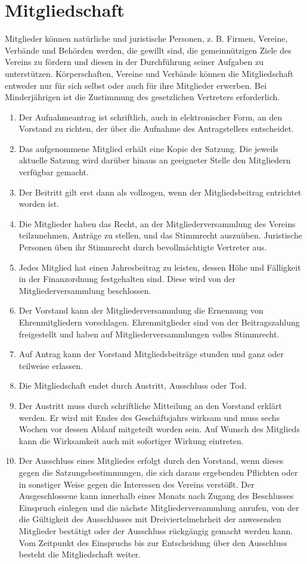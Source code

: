 \documentclass[12pt,a4paper,titlepage]{scrartcl}
\begin{document}
\section{Mitgliedschaft}
Mitglieder können natürliche und juristische Personen, z. B. Firmen, Vereine, 
Verbände und Behörden werden, die gewillt sind, die gemeinnützigen Ziele des Vereins 
zu fördern und diesen in der Durchführung seiner Aufgaben zu unterstützen. 
Körperschaften, Vereine und Verbände können die Mitgliedschaft entweder nur für sich 
selbst oder auch für ihre Mitglieder erwerben. Bei Minderjährigen ist die Zustimmung des 
gesetzlichen Vertreters erforderlich.
\begin{enumerate}
\item Der Aufnahmeantrag ist schriftlich, auch in elektronischer Form, an den 
Vorstand zu richten, der über die Aufnahme des Antragstellers entscheidet. 
\item Das aufgenommene Mitglied erhält eine Kopie der Satzung. Die jeweils 
aktuelle Satzung wird darüber hinaus an geeigneter Stelle den Mitgliedern 
verfügbar gemacht. 
\item Der Beitritt gilt erst dann als vollzogen, wenn der Mitgliedsbeitrag entrichtet 
worden ist. 
\item Die Mitglieder haben das Recht, an der Mitgliederversammlung des Vereins 
teilzunehmen, Anträge zu stellen, und das Stimmrecht auszuüben. Juristische 
Personen üben ihr Stimmrecht durch bevollmächtigte Vertreter aus. 
\item Jedes Mitglied hat einen Jahresbeitrag zu leisten, dessen Höhe und Fälligkeit 
in der Finanzordnung festgehalten sind. Diese wird von der 
Mitgliederversammlung beschlossen. 
\item Der Vorstand kann der Mitgliederversammlung die Ernennung von 
Ehrenmitgliedern vorschlagen. Ehrenmitglieder sind von der Beitragszahlung
freigestellt und haben auf Mitgliederversammlungen volles Stimmrecht. 
\item Auf Antrag kann der Vorstand Mitgliedsbeiträge stunden und ganz oder 
teilweise erlassen. 
\item Die Mitgliedschaft endet durch Austritt, Ausschluss oder Tod. 
\item Der Austritt muss durch schriftliche Mitteilung an den Vorstand erklärt werden. 
Er wird mit Endes des Geschäftsjahrs wirksam und muss sechs Wochen vor 
dessen Ablauf mitgeteilt worden sein. Auf Wunsch des Mitglieds kann die 
Wirksamkeit auch mit sofortiger Wirkung eintreten. 
\item Der Ausschluss eines Mitgliedes erfolgt durch den Vorstand, wenn dieses gegen die Satzungsbestimmungen, die sich daraus ergebenden Pflichten oder in sonstiger Weise gegen die Interessen des Vereins verstößt. Der Ausgeschlossene kann 
innerhalb eines Monats nach Zugang des Beschlusses Einspruch einlegen und 
die nächste Mitgliederversammlung anrufen, von der die Gültigkeit des 
Ausschlusses mit Dreiviertelmehrheit der anwesenden Mitglieder bestätigt oder 
der Ausschluss rückgängig gemacht werden kann. Vom Zeitpunkt des 
Einspruchs bis zur Entscheidung über den Ausschluss besteht die Mitgliedschaft 
weiter. 
\end{enumerate}
\end{document}
